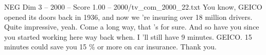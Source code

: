 \begin{textsample}{NEG Dim 3 – 2000 – Score 1.00 – 2000/tv\_com\_2000\_22.txt}  \label{ex:f3_neg_019}
You know, GEICO opened its doors back in 1936, and now we 're insuring over 18 million drivers.
Quite impressive, yeah.
Come a long way, that 's for sure.
And so have you since you started working here way back when.
I 'll still have 9 minutes.
GEICO. 15 minutes could save you 15 \% or more on car insurance.
Thank you.

\end{textsample}
